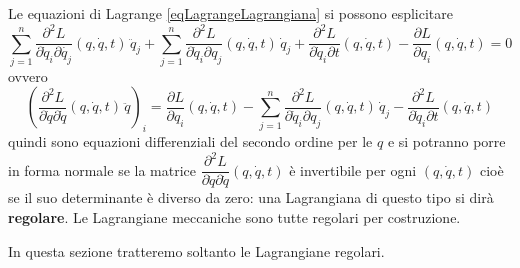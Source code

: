 \documentclass[11pt,a4paper,twoside]{book}
\theoremstyle{esss}
\theoremstyle{dotless}
\numberwithin{equation}{section} %
\begin{document}
Le equazioni di Lagrange \eqref{eqLagrangeLagrangiana} si possono esplicitare
\[
\sum_{j=1}^n \dfrac{\partial^2 L}{\partial \dot{q}_i \partial \dot{q_j}}(q,\dot{q},t)\, \ddot{q}_j + \sum_{j=1}^n \dfrac{\partial^2 L}{\partial \dot{q}_i \partial q_j}(q,\dot{q},t)\, \dot{q}_j + \dfrac{\partial^2 L}{\partial \dot{q}_i\partial t}(q,\dot{q},t) - \dfrac{\partial L}{\partial q_i}(q,\dot{q},t)=0
\]
ovvero
\begin{equation}\label{eqLagrangeLagrangianaEsplicite}
\left(\dfrac{\partial^2 L}{\partial \dot{q} \partial\dot{q}}(q,\dot{q},t)\, \ddot{q}\right)_i =
\dfrac{\partial L}{\partial q_i}(q,\dot{q},t) - \sum_{j=1}^n \dfrac{\partial^2 L}{\partial \dot{q}_i \partial q_j}(q,\dot{q},t)\, \dot{q}_j - \dfrac{\partial^2 L}{\partial \dot{q}_i\partial t}(q,\dot{q},t) 
\end{equation}
quindi sono equazioni differenziali del secondo ordine per le $q$ e si potranno porre in forma normale se la matrice $\dfrac{\partial^2 L}{\partial \dot{q} \partial\dot{q}}(q,\dot{q},t)$ è invertibile per ogni $(q,\dot{q},t)$ cioè se il suo determinante è diverso da zero: una Lagrangiana di questo tipo si dirà \textbf{regolare}.
Le Lagrangiane meccaniche sono tutte regolari per costruzione.

In questa sezione tratteremo soltanto le Lagrangiane regolari.
\end{document}
